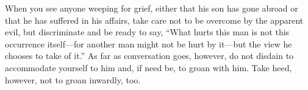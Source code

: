 When you see anyone weeping for grief, either that his son has gone
abroad or that he has suffered in his affairs, take care not to be
overcome by the apparent evil, but discriminate and be ready to say,
``What hurts this man is not this occurrence itself---for another man might
not be hurt by it---but the view he chooses to take of it.'' As far as
conversation goes, however, do not disdain to accommodate yourself to him
and, if need be, to groan with him. Take heed, however, not to groan
inwardly, too.
